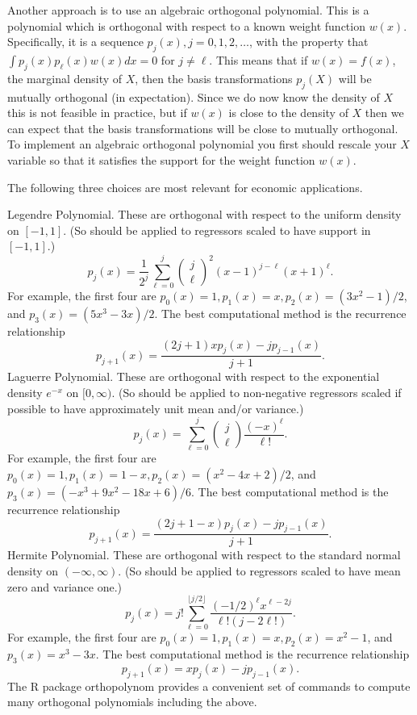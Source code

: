 \documentclass[10pt]{article}
\begin{document}
Another approach is to use an algebraic orthogonal polynomial. This is a polynomial which is orthogonal with respect to a known weight function $w(x)$. Specifically, it is a sequence $p_{j}(x), j=0,1,2, \ldots$, with the property that $\int p_{j}(x) p_{\ell}(x) w(x) d x=0$ for $j \neq \ell$. This means that if $w(x)=f(x)$, the marginal density of $X$, then the basis transformations $p_{j}(X)$ will be mutually orthogonal (in expectation). Since we do now know the density of $X$ this is not feasible in practice, but if $w(x)$ is close to the density of $X$ then we can expect that the basis transformations will be close to mutually orthogonal. To implement an algebraic orthogonal polynomial you first should rescale your $X$ variable so that it satisfies the support for the weight function $w(x)$.

The following three choices are most relevant for economic applications.

Legendre Polynomial. These are orthogonal with respect to the uniform density on $[-1,1]$. (So should be applied to regressors scaled to have support in $[-1,1]$.)
$$
p_{j}(x)=\frac{1}{2^{j}} \sum_{\ell=0}^{j}\left(\begin{array}{l}
j \\
\ell
\end{array}\right)^{2}(x-1)^{j-\ell}(x+1)^{\ell} .
$$
For example, the first four are $p_{0}(x)=1, p_{1}(x)=x, p_{2}(x)=\left(3 x^{2}-1\right) / 2$, and $p_{3}(x)=\left(5 x^{3}-3 x\right) / 2$. The best computational method is the recurrence relationship
$$
p_{j+1}(x)=\frac{(2 j+1) x p_{j}(x)-j p_{j-1}(x)}{j+1} .
$$
Laguerre Polynomial. These are orthogonal with respect to the exponential density $e^{-x}$ on $[0, \infty)$. (So should be applied to non-negative regressors scaled if possible to have approximately unit mean and/or variance.)
$$
p_{j}(x)=\sum_{\ell=0}^{j}\left(\begin{array}{l}
j \\
\ell
\end{array}\right) \frac{(-x)^{\ell}}{\ell !} .
$$
For example, the first four are $p_{0}(x)=1, p_{1}(x)=1-x, p_{2}(x)=\left(x^{2}-4 x+2\right) / 2$, and $p_{3}(x)=\left(-x^{3}+9 x^{2}-18 x+6\right) / 6$. The best computational method is the recurrence relationship
$$
p_{j+1}(x)=\frac{(2 j+1-x) p_{j}(x)-j p_{j-1}(x)}{j+1} .
$$
Hermite Polynomial. These are orthogonal with respect to the standard normal density on $(-\infty, \infty)$. (So should be applied to regressors scaled to have mean zero and variance one.)
$$
p_{j}(x)=j ! \sum_{\ell=0}^{\lfloor j / 2\rfloor} \frac{(-1 / 2)^{\ell} x^{\ell-2 j}}{\ell !(j-2 \ell !)} .
$$
For example, the first four are $p_{0}(x)=1, p_{1}(x)=x, p_{2}(x)=x^{2}-1$, and $p_{3}(x)=x^{3}-3 x$. The best computational method is the recurrence relationship
$$
p_{j+1}(x)=x p_{j}(x)-j p_{j-1}(x) .
$$
The R package orthopolynom provides a convenient set of commands to compute many orthogonal polynomials including the above.
\end{document}
